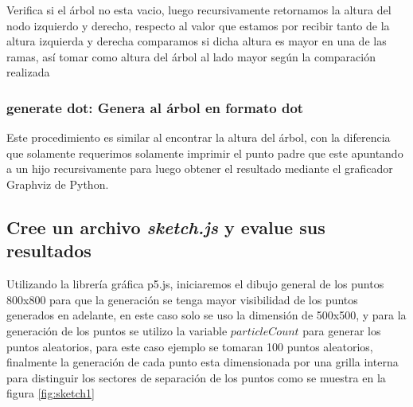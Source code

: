\documentclass{article}
\begin{document}
    		    Verifica si el árbol no esta vacio, luego recursivamente retornamos la altura del nodo izquierdo y derecho, respecto al valor que estamos por recibir tanto de la altura izquierda y derecha comparamos si dicha altura es mayor en una de las ramas, así tomar como altura del árbol al lado mayor según la comparación realizada
    		    
    		    
    		    
    		 \subsubsection{generate dot: Genera al árbol en formato dot} 
    		 
    		    Este procedimiento es similar al encontrar la altura del árbol, con la diferencia que solamente requerimos solamente imprimir el punto padre que este apuntando a un hijo recursivamente para luego obtener el resultado mediante el graficador Graphviz de Python.
    		    
    		    
		
		\subsection{Cree un archivo \textit{sketch.js}  y evalue sus resultados} 
		
		    Utilizando la librería gráfica p5.js, iniciaremos el dibujo general de los puntos 800x800 para que la generación se tenga mayor visibilidad de los puntos generados en adelante, en este caso solo se uso la dimensión de 500x500, y para la generación de los puntos se utilizo la variable $particleCount$ para generar los puntos aleatorios, para este caso ejemplo se tomaran 100 puntos aleatorios, finalmente la generación de cada punto esta dimensionada por una grilla interna para distinguir los sectores de separación de los puntos como se muestra en la figura \ref{fig:sketch1}
		    
\end{document}
